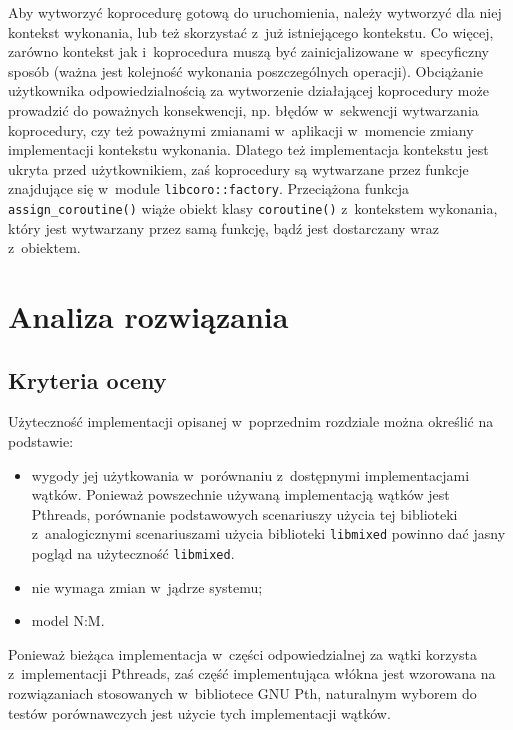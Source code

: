 \documentclass[12pt]{mwart}
\newcommand{\code}{\texttt}
\newcommand{\dcolon}{::}
\newcommand{\procbr}{()}
\begin{document}
\par
%
\indent
	Aby wytworzyć koprocedurę gotową do uruchomienia, należy wytworzyć dla niej kontekst wykonania, lub też skorzystać z~już istniejącego
	kontekstu. Co więcej, zarówno kontekst jak i~koprocedura muszą być zainicjalizowane w~specyficzny sposób (ważna jest kolejność wykonania
	poszczególnych operacji). Obciążanie użytkownika odpowiedzialnością za wytworzenie działającej koprocedury może prowadzić do poważnych
	konsekwencji, np. błędów w~sekwencji wytwarzania koprocedury, czy też poważnymi zmianami w~aplikacji w~momencie zmiany implementacji
	kontekstu wykonania. Dlatego też implementacja kontekstu jest ukryta przed użytkownikiem, zaś koprocedury są wytwarzane przez funkcje znajdujące
	się w~module \code{libcoro\dcolon factory}. Przeciążona funkcja \code{assign\_coroutine\procbr} wiąże obiekt klasy \code{coroutine\procbr}
	z~kontekstem wykonania, który jest wytwarzany przez samą funkcję, bądź jest dostarczany wraz z~obiektem.
\par
%
\section{Analiza rozwiązania}
\label{sec:analysis}
\subsection{Kryteria oceny}
\indent
	Użyteczność implementacji opisanej w~poprzednim rozdziale można określić na podstawie:
	\begin{itemize}
		\item wygody jej użytkowania w~porównaniu z~dostępnymi implementacjami wątków. Ponieważ powszechnie używaną implementacją wątków jest Pthreads,
      porównanie podstawowych scenariuszy użycia tej biblioteki z~analogicznymi scenariuszami użycia biblioteki \code{libmixed} powinno dać jasny pogląd
      na użyteczność \code{libmixed}.
		\item nie wymaga zmian w~jądrze systemu;
		\item model N:M.
	\end{itemize}
	Ponieważ bieżąca implementacja w~części odpowiedzialnej za wątki korzysta z~implementacji Pthreads, zaś część implementująca włókna
	jest wzorowana na rozwiązaniach stosowanych w~bibliotece GNU Pth, naturalnym wyborem do testów porównawczych jest
	użycie tych implementacji wątków.
\par
%
\end{document}
